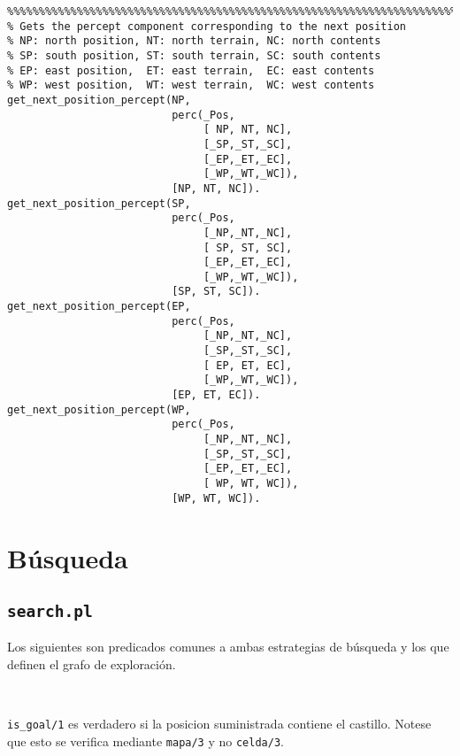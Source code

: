 \documentclass[a4paper,12pt]{report}
\begin{document}
\begin{verbatim}
%%%%%%%%%%%%%%%%%%%%%%%%%%%%%%%%%%%%%%%%%%%%%%%%%%%%%%%%%%%%%%%%%%%%%%%%%%%%%%%
% Gets the percept component corresponding to the next position
% NP: north position, NT: north terrain, NC: north contents
% SP: south position, ST: south terrain, SC: south contents
% EP: east position,  ET: east terrain,  EC: east contents
% WP: west position,  WT: west terrain,  WC: west contents
get_next_position_percept(NP,
                          perc(_Pos,
                               [ NP, NT, NC],
                               [_SP,_ST,_SC],
                               [_EP,_ET,_EC],
                               [_WP,_WT,_WC]),
                          [NP, NT, NC]).
get_next_position_percept(SP,
                          perc(_Pos,
                               [_NP,_NT,_NC],
                               [ SP, ST, SC],
                               [_EP,_ET,_EC],
                               [_WP,_WT,_WC]),
                          [SP, ST, SC]).
get_next_position_percept(EP,
                          perc(_Pos,
                               [_NP,_NT,_NC],
                               [_SP,_ST,_SC],
                               [ EP, ET, EC],
                               [_WP,_WT,_WC]),
                          [EP, ET, EC]).
get_next_position_percept(WP,
                          perc(_Pos,
                               [_NP,_NT,_NC],
                               [_SP,_ST,_SC],
                               [_EP,_ET,_EC],
                               [ WP, WT, WC]),
                          [WP, WT, WC]).

\end{verbatim}

\section{B\'{u}squeda}

\subsection{\texttt{search.pl}}

Los siguientes son predicados comunes a ambas estrategias de b\'{u}squeda y los que definen el grafo de exploraci\'{o}n.

\

\texttt{is\_goal/1} es verdadero si la posicion suministrada contiene el castillo.
Notese que esto se verifica mediante \texttt{mapa/3} y no \texttt{celda/3}.
\end{document}
